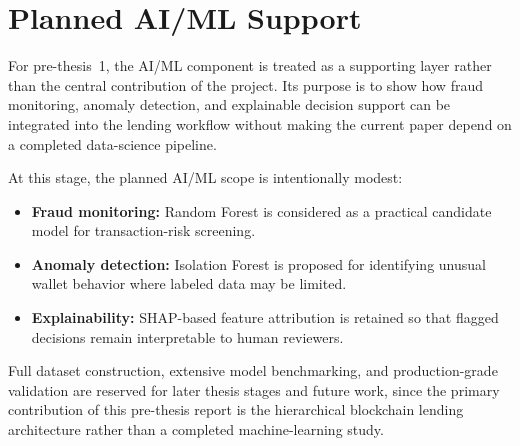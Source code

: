 \documentclass[12pt,a4paper]{report}
\begin{document}
\section{Planned AI/ML Support}

For pre-thesis~1, the AI/ML component is treated as a supporting layer rather than the central contribution of the project. Its purpose is to show how fraud monitoring, anomaly detection, and explainable decision support can be integrated into the lending workflow without making the current paper depend on a completed data-science pipeline.

At this stage, the planned AI/ML scope is intentionally modest:

\begin{itemize}[noitemsep]
\item \textbf{Fraud monitoring:} Random Forest is considered as a practical candidate model for transaction-risk screening.
\item \textbf{Anomaly detection:} Isolation Forest is proposed for identifying unusual wallet behavior where labeled data may be limited.
\item \textbf{Explainability:} SHAP-based feature attribution is retained so that flagged decisions remain interpretable to human reviewers.
\end{itemize}

Full dataset construction, extensive model benchmarking, and production-grade validation are reserved for later thesis stages and future work, since the primary contribution of this pre-thesis report is the hierarchical blockchain lending architecture rather than a completed machine-learning study.
\end{document}
